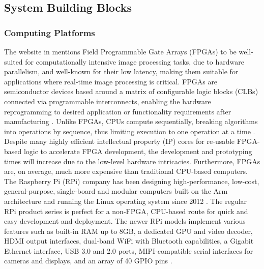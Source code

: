 \subsection{System Building Blocks}
\label{bi_bb}
\subsubsection{Computing Platforms}
The website in \cite{dev22adminGPUVsFPGA2023} mentions Field Programmable Gate Arrays (FPGAs) to be well-suited for computationally intensive image processing tasks, due to hardware parallelism, and well-known for their low latency, making them suitable for applications where real-time image processing is critical. FPGAs are semiconductor devices based around a matrix of configurable logic blocks (CLBs) connected via programmable interconnects, enabling the hardware reprogramming to desired application or functionality requirements after manufacturing \cite{WhatFPGAField}. Unlike FPGAs, CPUs compute sequentially, breaking algorithms into operations by sequence, thus limiting execution to one operation at a time \cite{alexliangBoostingMachineVision2016}. Despite many highly efficient intellectual property (IP) cores for re-usable FPGA-based logic to accelerate FPGA development, the development and prototyping times will increase due to the low-level hardware intricacies. Furthermore, FPGAs are, on average, much more expensive than traditional CPU-based computers. The Raspberry Pi (RPi) company has been designing high-performance, low-cost, general-purpose, single-board and modular computers built on the Arm architecture and running the Linux operating system since 2012 \cite{raspberrypiRaspberryPiUs}. The regular RPi product series is perfect for a non-FPGA, CPU-based route for quick and easy development and deployment. The newer RPi models implement various features such as built-in RAM up to 8GB, a dedicated GPU and video decoder, HDMI output interfaces, dual-band WiFi with Bluetooth capabilities, a Gigabit Ethernet interface, USB 3.0 and 2.0 ports, MIPI-compatible serial interfaces for cameras and displays, and an array of 40 GPIO pins \cite{raspberrypiltdBuyRaspberryPi, raspberrypiltdBuyRaspberryPia}.

